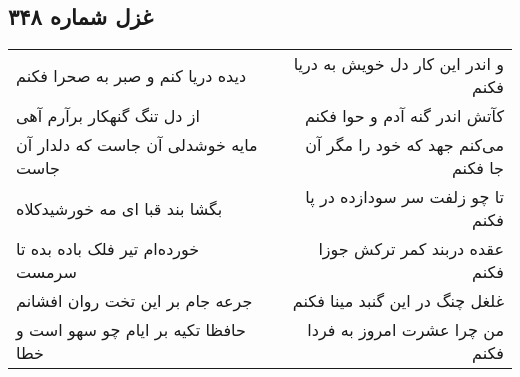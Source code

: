 \begin{center}
\section*{غزل شماره ۳۴۸}
\label{sec:sh348}
\begin{longtable}{l p{0.5cm} r}
دیده دریا کنم و صبر به صحرا فکنم
&&
و اندر این کار دل خویش به دریا فکنم
\\
از دل تنگ گنهکار برآرم آهی
&&
کآتش اندر گنه آدم و حوا فکنم
\\
مایه خوشدلی آن جاست که دلدار آن جاست
&&
می‌کنم جهد که خود را مگر آن جا فکنم
\\
بگشا بند قبا ای مه خورشیدکلاه
&&
تا چو زلفت سر سودازده در پا فکنم
\\
خورده‌ام تیر فلک باده بده تا سرمست
&&
عقده دربند کمر ترکش جوزا فکنم
\\
جرعه جام بر این تخت روان افشانم
&&
غلغل چنگ در این گنبد مینا فکنم
\\
حافظا تکیه بر ایام چو سهو است و خطا
&&
من چرا عشرت امروز به فردا فکنم
\\
\end{longtable}
\end{center}
